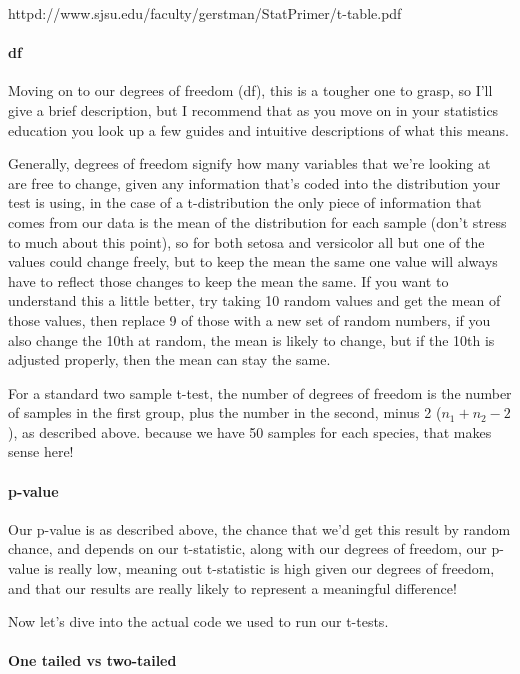\documentclass[
]{article}
\begin{document}
httpd://www.sjsu.edu/faculty/gerstman/StatPrimer/t-table.pdf

\hypertarget{df}{%
\paragraph{df}\label{df}}

Moving on to our degrees of freedom (df), this is a tougher one to
grasp, so I'll give a brief description, but I recommend that as you
move on in your statistics education you look up a few guides and
intuitive descriptions of what this means.

Generally, degrees of freedom signify how many variables that we're
looking at are free to change, given any information that's coded into
the distribution your test is using, in the case of a t-distribution the
only piece of information that comes from our data is the mean of the
distribution for each sample (don't stress to much about this point), so
for both setosa and versicolor all but one of the values could change
freely, but to keep the mean the same one value will always have to
reflect those changes to keep the mean the same. If you want to
understand this a little better, try taking 10 random values and get the
mean of those values, then replace 9 of those with a new set of random
numbers, if you also change the 10th at random, the mean is likely to
change, but if the 10th is adjusted properly, then the mean can stay the
same.

For a standard two sample t-test, the number of degrees of freedom is
the number of samples in the first group, plus the number in the second,
minus 2 (\({n_1}+{n_2}-2\)), as described above. because we have 50
samples for each species, that makes sense here!

\hypertarget{p-value}{%
\paragraph{p-value}\label{p-value}}

Our p-value is as described above, the chance that we'd get this result
by random chance, and depends on our t-statistic, along with our degrees
of freedom, our p-value is really low, meaning out t-statistic is high
given our degrees of freedom, and that our results are really likely to
represent a meaningful difference!

Now let's dive into the actual code we used to run our t-tests.

\hypertarget{one-tailed-vs-two-tailed}{%
\paragraph{One tailed vs two-tailed}\label{one-tailed-vs-two-tailed}}
\end{document}
